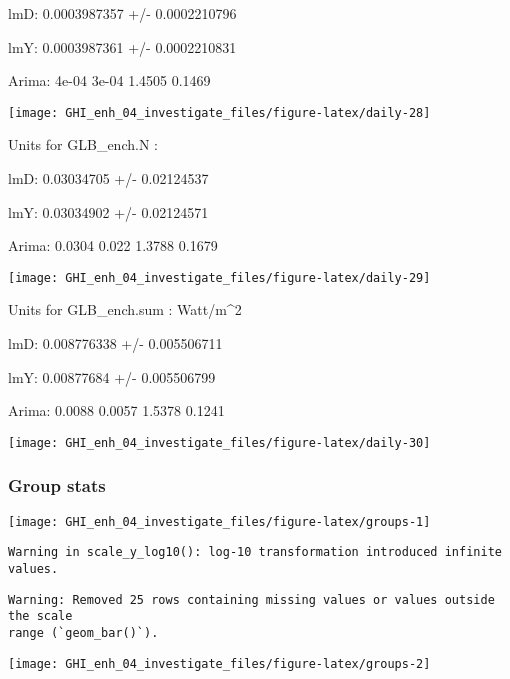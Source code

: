 \documentclass[
  10pt,
  a4paper,oneside]{article}
\begin{document}
lmD: 0.0003987357 +/- 0.0002210796

lmY: 0.0003987361 +/- 0.0002210831

Arima: 4e-04 3e-04 1.4505 0.1469

\begin{center}\texttt{[image: GHI\_enh\_04\_investigate\_files/figure-latex/daily-28]} \end{center}

Units for GLB\_ench.N :

lmD: 0.03034705 +/- 0.02124537

lmY: 0.03034902 +/- 0.02124571

Arima: 0.0304 0.022 1.3788 0.1679

\begin{center}\texttt{[image: GHI\_enh\_04\_investigate\_files/figure-latex/daily-29]} \end{center}

Units for GLB\_ench.sum : Watt/m\^{}2

lmD: 0.008776338 +/- 0.005506711

lmY: 0.00877684 +/- 0.005506799

Arima: 0.0088 0.0057 1.5378 0.1241

\begin{center}\texttt{[image: GHI\_enh\_04\_investigate\_files/figure-latex/daily-30]} \end{center}

\newpage
\FloatBarrier

\hypertarget{group-stats}{%
\subsubsection{Group stats}\label{group-stats}}

\begin{center}\texttt{[image: GHI\_enh\_04\_investigate\_files/figure-latex/groups-1]} \end{center}

\begin{verbatim}
Warning in scale_y_log10(): log-10 transformation introduced infinite values.
\end{verbatim}

\begin{verbatim}
Warning: Removed 25 rows containing missing values or values outside the scale
range (`geom_bar()`).
\end{verbatim}

\begin{center}\texttt{[image: GHI\_enh\_04\_investigate\_files/figure-latex/groups-2]} \end{center}
\end{document}
